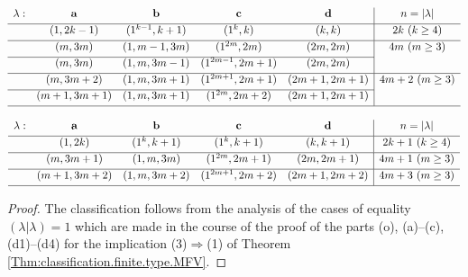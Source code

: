 \documentclass[12pt,reqno]{amsart}
\begin{document}
\begin{theorem}
\begin{table}[H]
{\footnotesize
$\begin{array}{ccccc|c}
    \lambda: & \mbfa & \mbfb & \mbfc & \mbfd & n=|\lambda|
    \\[1mm] \hline
    & (1,2 k - 1) & (1^{k - 1},k + 1) & (1^k,k) & (k,k) & 2k\ (k\geq 4)
    \\[1mm] \hline
    & (m, 3 m) & (1, m - 1, 3 m) & (1^{2m}, 2m) & (2m, 2m) & 4m\ (m\geq 3)
    \\[1mm] \cline{1-5}
    & (m, 3 m) & (1, m, 3 m - 1) & (1^{2m - 1}, 2m + 1) & (2m, 2m)
    \\[1mm] \hline
    & (m, 3 m + 2) & (1, m, 3 m + 1) & (1^{2m + 1}, 2m + 1) & (2m + 1, 2m + 1) & 4m+2\ (m\geq 3)
    \\[1mm] \cline{1-5}
    & (m + 1, 3 m + 1) & (1, m, 3 m + 1) & (1^{2m}, 2m + 2) & (2m + 1, 2m + 1)
    \\[1mm] \hline
    \end{array}$}
\caption{Dimension vectors $\lambda$ of finite type with $(\lambda|\lambda)=1$: infinite series, $|\lambda|$ even}
\label{list.indecomposables:even}
\end{table}

\begin{table}[H]
{\footnotesize
$\begin{array}{ccccc|c}
    \lambda: & \mathbf{a} & \mathbf{b} & \mathbf{c} & \mathbf{d} & n=|\lambda|
    \\[1mm] \hline
    & (1,2 k) & (1^k,k + 1) & (1^k,k + 1) & (k,k + 1) & 2k+1\ (k\geq 4)
    \\[1mm] \hline
    & (m, 3 m + 1) & (1, m, 3 m) & (1^{2m}, 2m + 1) & (2 m , 2m + 1) & 4m+1\ (m\geq 3)
    \\[1mm] \hline
    & (m + 1, 3 m + 2) & (1, m, 3 m + 2) & (1^{2m + 1}, 2m + 2) & (2 m + 1, 2m + 2) & 4m+3\ (m\geq 3)
    \\[1mm] \hline
    \end{array}$}
\caption{Dimension vectors $\lambda$ of finite type with $(\lambda|\lambda)=1$: infinite series, $|\lambda|$ odd}
\label{list.indecomposables:odd}
\end{table}
\end{theorem}

\begin{proof}
The classification follows from the analysis of the
cases of equality $(\lambda|\lambda)=1$ which are
made in the course of the proof of the parts (o), (a)--(c), (d1)--(d4) for the implication (3)$\Rightarrow$(1) of Theorem \ref{Thm:classification.finite.type.MFV}.
\end{proof}
\end{document}
